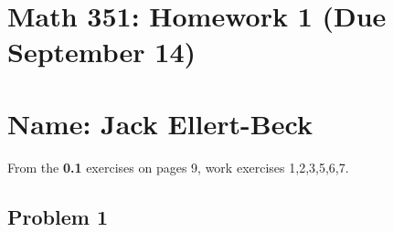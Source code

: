 \documentclass[11pt]{article}
\begin{document}
\setlength{\parindent}{0pt}
\setlength{\parskip}{9pt}


\section*{Math 351: Homework 1 (Due September 14)}
\section*{Name: Jack Ellert-Beck}

\bigskip

From the {\bf 0.1} exercises on pages 9, work exercises 1,2,3,5,6,7.

\subsection*{Problem 1}
\end{document}
